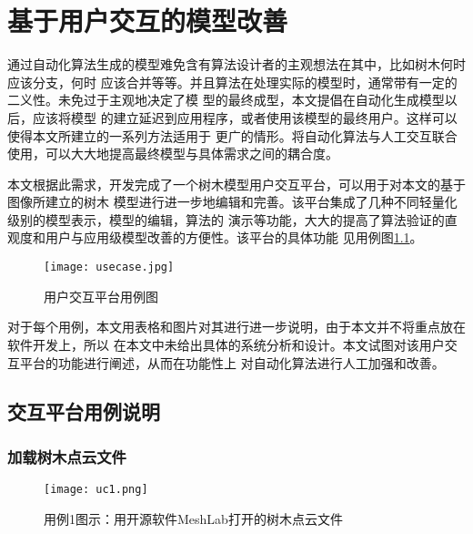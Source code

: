 \chapter{基于用户交互的模型改善}
通过自动化算法生成的模型难免含有算法设计者的主观想法在其中，比如树木何时应该分支，何时
应该合并等等。并且算法在处理实际的模型时，通常带有一定的二义性。未免过于主观地决定了模
型的最终成型，本文提倡在自动化生成模型以后，应该将模型
的建立延迟到应用程序，或者使用该模型的最终用户。这样可以使得本文所建立的一系列方法适用于
更广的情形。将自动化算法与人工交互联合使用，可以大大地提高最终模型与具体需求之间的耦合度。

本文根据此需求，开发完成了一个树木模型用户交互平台，可以用于对本文的基于图像所建立的树木
模型进行进一步地编辑和完善。该平台集成了几种不同轻量化级别的模型表示，模型的编辑，算法的
演示等功能，大大的提高了算法验证的直观度和用户与应用级模型改善的方便性。该平台的具体功能
见用例图\ref{fig:usecase}。

\begin{figure}[H]
	\centering
	\texttt{[image: usecase.jpg]}
	\caption{用户交互平台用例图}
	\label{fig:usecase}
\end{figure}

对于每个用例，本文用表格和图片对其进行进一步说明，由于本文并不将重点放在软件开发上，所以
在本文中未给出具体的系统分析和设计。本文试图对该用户交互平台的功能进行阐述，从而在功能性上
对自动化算法进行人工加强和改善。

\section{交互平台用例说明}
\clearpage
\subsection{加载树木点云文件}

\begin{figure}[H]
	\centering
	\texttt{[image: uc1.png]}
	\caption{用例1图示：用开源软件MeshLab打开的树木点云文件}
	\label{fig:uc1}
\end{figure}

